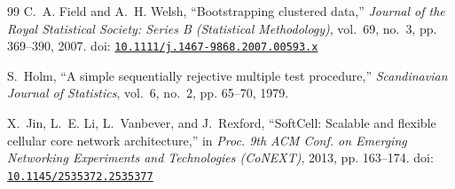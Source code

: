 \begin{thebibliography}{99}
C.~A. Field and A.~H. Welsh, ``Bootstrapping clustered data,'' \emph{Journal of
  the Royal Statistical Society: Series B (Statistical Methodology)}, vol.~69,
  no.~3, pp. 369--390, 2007. doi:
  \href{https://doi.org/10.1111/j.1467-9868.2007.00593.x}{\nolinkurl{10.1111/j.1467-9868.2007.00593.x}}

S.~Holm, ``A simple sequentially rejective multiple test procedure,''
  \emph{Scandinavian Journal of Statistics}, vol.~6, no.~2, pp. 65--70, 1979.

X.~Jin, L.~E. Li, L.~Vanbever, and J.~Rexford, ``{SoftCell}: Scalable and
  flexible cellular core network architecture,'' in \emph{Proc. 9th ACM Conf.
  on Emerging Networking Experiments and Technologies (CoNEXT)}, 2013, pp.
  163--174. doi:
  \href{https://doi.org/10.1145/2535372.2535377}{\nolinkurl{10.1145/2535372.2535377}}

\end{thebibliography}
